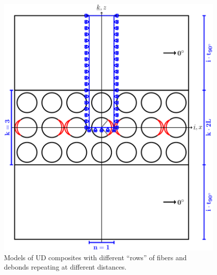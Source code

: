 \documentclass[review]{elsarticle}
\begin{document}
\begin{figure}[!h]
\centering
        \includegraphics[height=0.3\textheight]{thickPlycentraldebondsline.pdf}
\caption{Models of UD composites with different ``rows'' of fibers and debonds repeating at different distances.}\label{fig:laminateModelsB}
\end{figure}
\end{document}
